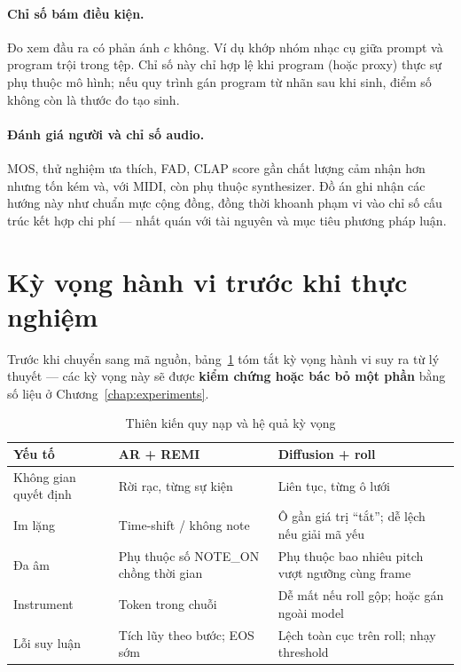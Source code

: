 \paragraph{Chỉ số bám điều kiện.}
Đo xem đầu ra có phản ánh $c$ không. Ví dụ khớp nhóm nhạc cụ giữa prompt và program trội trong tệp. Chỉ số này chỉ hợp lệ khi program (hoặc proxy) thực sự phụ thuộc mô hình; nếu quy trình gán program từ nhãn sau khi sinh, điểm số không còn là thước đo tạo sinh.

\paragraph{Đánh giá người và chỉ số audio.}
MOS, thử nghiệm ưa thích, FAD, CLAP score gần chất lượng cảm nhận hơn nhưng tốn kém và, với MIDI, còn phụ thuộc synthesizer. Đồ án ghi nhận các hướng này như chuẩn mực cộng đồng, đồng thời khoanh phạm vi vào chỉ số cấu trúc kết hợp chi phí --- nhất quán với tài nguyên và mục tiêu phương pháp luận.

\section{Kỳ vọng hành vi trước khi thực nghiệm}
\label{sec:ch2-bias-summary}

Trước khi chuyển sang mã nguồn, bảng~\ref{tab:ch2-bias} tóm tắt kỳ vọng hành vi suy ra từ lý thuyết --- các kỳ vọng này sẽ được \textbf{kiểm chứng hoặc bác bỏ một phần} bằng số liệu ở Chương~\ref{chap:experiments}.

\begin{table}[htbp]
\centering
\caption{Thiên kiến quy nạp và hệ quả kỳ vọng}
\label{tab:ch2-bias}
\small
\begin{tabular}{p{3.2cm}p{5.4cm}p{5.4cm}}
\toprule
\textbf{Yếu tố} & \textbf{AR + REMI} & \textbf{Diffusion + roll} \\
\midrule
Không gian quyết định &
Rời rạc, từng sự kiện &
Liên tục, từng ô lưới \\
\midrule
Im lặng &
Time-shift / không note &
Ô gần giá trị ``tắt''; dễ lệch nếu giải mã yếu \\
\midrule
Đa âm &
Phụ thuộc số NOTE\_ON chồng thời gian &
Phụ thuộc bao nhiêu pitch vượt ngưỡng cùng frame \\
\midrule
Instrument &
Token trong chuỗi &
Dễ mất nếu roll gộp; hoặc gán ngoài model \\
\midrule
Lỗi suy luận &
Tích lũy theo bước; EOS sớm &
Lệch toàn cục trên roll; nhạy threshold \\
\bottomrule
\end{tabular}
\end{table}

